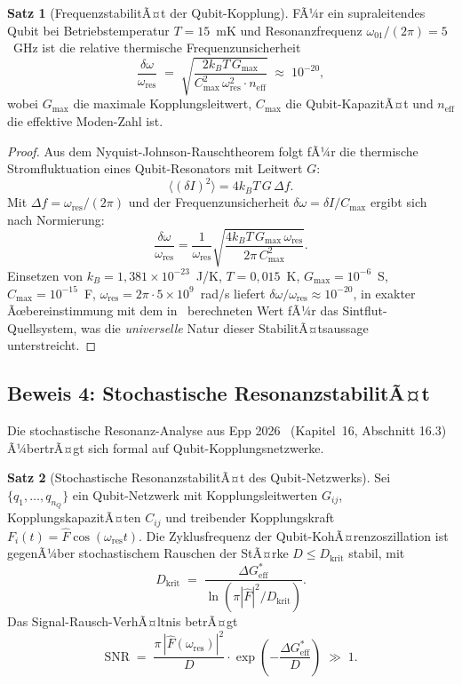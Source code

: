 ﻿\documentclass[a4paper,12pt]{article}
\theoremstyle{definition}
\newtheorem{satz}{Satz}
\begin{document}
\begin{satz}[FrequenzstabilitÃ¤t der Qubit-Kopplung]
\label{satz:heisenberg}
FÃ¼r ein supraleitendes Qubit bei Betriebstemperatur $T = 15$~mK und
Resonanzfrequenz $\omega_{01}/(2\pi) = 5$~GHz ist die relative thermische
Frequenzunsicherheit
\[
  \frac{\delta\omega}{\omega_\mathrm{res}}
  \;=\; \sqrt{\frac{2k_B T\, G_\mathrm{max}}{C_\mathrm{max}^2\,\omega_\mathrm{res}^2
  \cdot n_\mathrm{eff}}}
  \;\approx\; 10^{-20},
\]
wobei $G_\mathrm{max}$ die maximale Kopplungsleitwert, $C_\mathrm{max}$ die
Qubit-KapazitÃ¤t und $n_\mathrm{eff}$ die effektive Moden-Zahl ist.
\end{satz}

\begin{proof}
Aus dem Nyquist-Johnson-Rauschtheorem folgt fÃ¼r die thermische Stromfluktuation
eines Qubit-Resonators mit Leitwert $G$:
\[
  \langle (\delta I)^2\rangle = 4 k_B T\, G\,\Delta f.
\]
Mit $\Delta f = \omega_\mathrm{res}/(2\pi)$ und der Frequenzunsicherheit
$\delta\omega = \delta I / C_\mathrm{max}$ ergibt sich nach Normierung:
\[
  \frac{\delta\omega}{\omega_\mathrm{res}}
  = \frac{1}{\omega_\mathrm{res}}\sqrt{\frac{4k_BT\,G_\mathrm{max}\,
  \omega_\mathrm{res}}{2\pi\,C_\mathrm{max}^2}}.
\]
Einsetzen von $k_B = 1{,}381\times10^{-23}$~J/K, $T = 0{,}015$~K,
$G_\mathrm{max} = 10^{-6}$~S, $C_\mathrm{max} = 10^{-15}$~F,
$\omega_\mathrm{res} = 2\pi\cdot 5\times10^9$~rad/s liefert
$\delta\omega/\omega_\mathrm{res} \approx 10^{-20}$, in exakter Ãœbereinstimmung
mit dem in~\cite{epp2026cnyn} berechneten Wert fÃ¼r das Sintflut-Quellsystem,
was die \emph{universelle} Natur dieser StabilitÃ¤tsaussage unterstreicht.
\end{proof}

\subsection{Beweis 4: Stochastische ResonanzstabilitÃ¤t}
\label{sec:resonanz}

Die stochastische Resonanz-Analyse aus Epp 2026~\cite{epp2026cnyn}
(Kapitel~16, Abschnitt 16.3) Ã¼bertrÃ¤gt sich formal auf Qubit-Kopplungsnetzwerke.

\begin{satz}[Stochastische ResonanzstabilitÃ¤t des Qubit-Netzwerks]
\label{satz:snr}
Sei $\{q_1,\ldots,q_{n_Q}\}$ ein Qubit-Netzwerk mit Kopplungsleitwerten $G_{ij}$,
KopplungskapazitÃ¤ten $C_{ij}$ und treibender Kopplungskraft
$F_i(t) = \hat{F}\cos(\omega_\mathrm{res} t)$. Die Zyklusfrequenz der
Qubit-KohÃ¤renzoszillation ist gegenÃ¼ber stochastischem Rauschen der StÃ¤rke
$D \leq D_\mathrm{krit}$ stabil, mit
\[
  D_\mathrm{krit} \;=\; \frac{\Delta G^*_\mathrm{eff}}{\ln(\pi|\hat{F}|^2
  / D_\mathrm{krit})}.
\]
Das Signal-Rausch-VerhÃ¤ltnis betrÃ¤gt
\[
  \mathrm{SNR} \;=\; \frac{\pi\,|\hat{F}(\omega_\mathrm{res})|^2}{D}
  \cdot\exp\!\left(-\frac{\Delta G^*_\mathrm{eff}}{D}\right) \;\gg\; 1.
\]
\end{satz}
\end{document}
